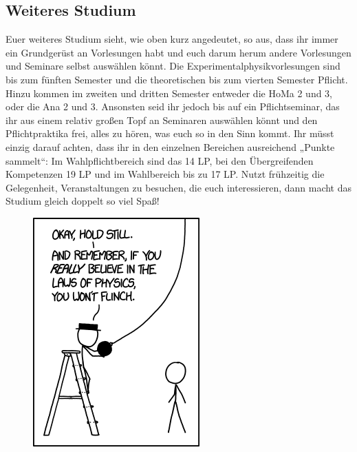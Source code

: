 \subsection{Weiteres Studium}

Euer weiteres Studium sieht, wie oben kurz angedeutet, so aus, dass ihr immer ein Grundgerüst an Vorlesungen habt und euch darum herum andere Vorlesungen und Seminare selbst auswählen könnt. Die Experimentalphysikvorlesungen sind bis zum fünften Semester und die theoretischen bis zum vierten Semester Pflicht. Hinzu kommen im zweiten und dritten Semester entweder die \gls{HoMa} 2 und 3, oder die \gls{Ana} 2 und 3. Ansonsten seid ihr jedoch bis auf ein Pflichtseminar, das ihr aus einem relativ großen Topf an Seminaren auswählen könnt und den Pflichtpraktika frei, alles zu hören, was euch so in den Sinn kommt. Ihr müsst einzig darauf achten, dass ihr in den einzelnen Bereichen ausreichend „Punkte sammelt“: Im Wahlpflichtbereich sind das 14 \gls{LP}, bei den Übergreifenden Kompetenzen 19 \gls{LP} und im Wahlbereich bis zu 17 \gls{LP}. Nutzt frühzeitig die Gelegenheit, Veranstaltungen zu besuchen, die euch interessieren, dann macht das Studium gleich doppelt so viel Spaß!

\begin{figure}[b]
	\centering
	\includegraphics[width=.75\linewidth]{bilder/laws_of_physics.png}
\end{figure}

